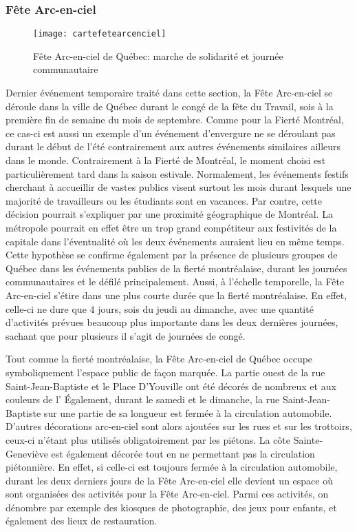 \subsubsection{Fête Arc-en-ciel}
\label{subsec:fetearcenciel}
\begin{figure}[ht!]
 \centering
 \texttt{[image: cartefetearcenciel]}
 \caption[Fête Arc-en-ciel de Québec]{Fête Arc-en-ciel de Québec: marche de solidarité et journée communautaire}\label{fig:cartefetearcenciel}
\end{figure}

Dernier événement temporaire traité dans cette section, la Fête Arc-en-ciel se déroule dans la ville de Québec durant le congé de la fête du Travail, sois à la première fin de semaine du mois de septembre.
Comme pour la Fierté Montréal, ce cas-ci est aussi un exemple d'un événement d'envergure ne se déroulant pas durant le début de l'été contrairement aux autres événements similaires ailleurs dans le monde.
Contrairement à la Fierté de Montréal, le moment choisi est particulièrement tard dans la saison estivale.
Normalement, les événements festifs cherchant à accueillir de vastes publics visent surtout les mois durant lesquels une majorité de travailleurs ou les étudiants sont en vacances.
Par contre, cette décision pourrait s'expliquer par une proximité géographique de Montréal.
La métropole pourrait en effet être un trop grand compétiteur aux festivités de la capitale dans l'éventualité où les deux événements auraient lieu en même temps.
Cette hypothèse se confirme également par la présence de plusieurs groupes de Québec dans les événements publics de la fierté montréalaise, durant les journées communautaires et le défilé principalement.
Aussi, à l'échelle temporelle, la Fête Arc-en-ciel s'étire dans une plus courte durée que la fierté montréalaise.
En effet, celle-ci ne dure que 4 jours, sois du jeudi au dimanche, avec une quantité d'activités prévues beaucoup plus importante dans les deux dernières journées, sachant que pour plusieurs il s'agit de journées de congé.

Tout comme la fierté montréalaise, la Fête Arc-en-ciel de Québec occupe symboliquement l'espace public de façon marquée.
La partie ouest de la rue Saint-Jean-Baptiste et le Place D'Youville ont été décorés de nombreux   et  aux couleurs de l'
Également, durant le samedi et le dimanche, la rue Saint-Jean-Baptiste sur une partie de sa longueur est fermée à la circulation automobile.
D'autres décorations arc-en-ciel sont alors ajoutées sur les rues et sur les trottoirs, ceux-ci n'étant plus utilisés obligatoirement par les piétons.
La côte Sainte-Geneviève est également décorée tout en ne permettant pas la circulation piétonnière.
En effet, si celle-ci est toujours fermée à la circulation automobile, durant les deux derniers jours de la Fête Arc-en-ciel elle devient un espace où sont organisées des activités pour la Fête Arc-en-ciel. Parmi ces activités, on dénombre par exemple des kiosques de photographie, des jeux pour enfants, et également des lieux de restauration.

